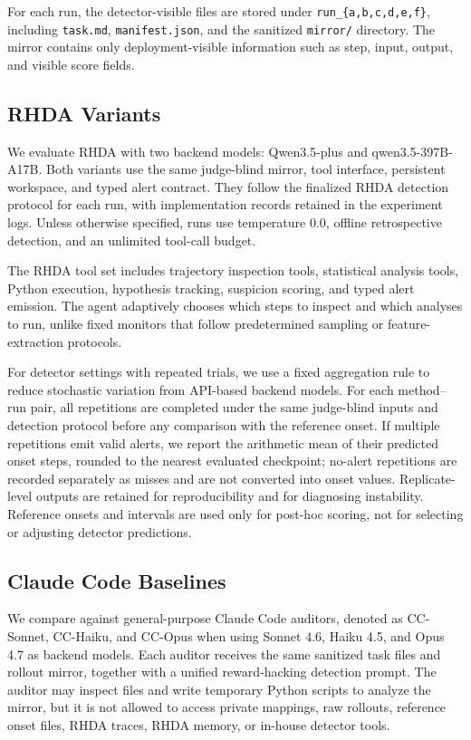 \documentclass[11pt]{article}
\begin{document}
For each run, the detector-visible files are stored under \texttt{run\_\{a,b,c,d,e,f\}}, including \texttt{task.md}, \texttt{manifest.json}, and the sanitized \texttt{mirror/} directory. The mirror contains only deployment-visible information such as step, input, output, and visible score fields.

\subsection{RHDA Variants}

We evaluate RHDA with two backend models: Qwen3.5-plus and qwen3.5-397B-A17B. Both variants use the same judge-blind mirror, tool interface, persistent workspace, and typed alert contract. They follow the finalized RHDA detection protocol for each run, with implementation records retained in the experiment logs. Unless otherwise specified, runs use temperature \(0.0\), offline retrospective detection, and an unlimited tool-call budget.

The RHDA tool set includes trajectory inspection tools, statistical analysis tools, Python execution, hypothesis tracking, suspicion scoring, and typed alert emission. The agent adaptively chooses which steps to inspect and which analyses to run, unlike fixed monitors that follow predetermined sampling or feature-extraction protocols.

For detector settings with repeated trials, we use a fixed aggregation rule to reduce stochastic variation from API-based backend models. For each method--run pair, all repetitions are completed under the same judge-blind inputs and detection protocol before any comparison with the reference onset. If multiple repetitions emit valid alerts, we report the arithmetic mean of their predicted onset steps, rounded to the nearest evaluated checkpoint; no-alert repetitions are recorded separately as misses and are not converted into onset values. Replicate-level outputs are retained for reproducibility and for diagnosing instability. Reference onsets and intervals are used only for post-hoc scoring, not for selecting or adjusting detector predictions.

\subsection{Claude Code Baselines}

We compare against general-purpose Claude Code auditors, denoted as CC-Sonnet, CC-Haiku, and CC-Opus when using Sonnet 4.6, Haiku 4.5, and Opus 4.7 as backend models. Each auditor receives the same sanitized task files and rollout mirror, together with a unified reward-hacking detection prompt. The auditor may inspect files and write temporary Python scripts to analyze the mirror, but it is not allowed to access private mappings, raw rollouts, reference onset files, RHDA traces, RHDA memory, or in-house detector tools.
\end{document}

